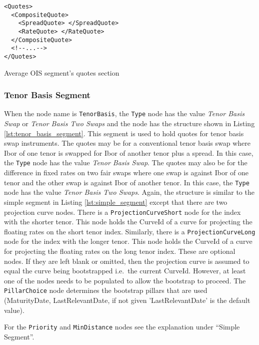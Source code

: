 \begin{listing}[H]
\begin{verbatim}
<Quotes>
  <CompositeQuote>
    <SpreadQuote> </SpreadQuote>
    <RateQuote> </RateQuote>
  </CompositeQuote>
  <!--...-->
</Quotes>
\end{verbatim}
\caption{Average OIS segment's quotes section}
\label{lst:average_ois_quotes}
\end{listing}

\subsubsection*{Tenor Basis Segment}
When the node name is \lstinline!TenorBasis!, the \lstinline!Type! node has the value \emph{Tenor Basis Swap} or
\emph{Tenor Basis Two Swaps} and the node has the structure shown in Listing \ref{lst:tenor_basis_segment}. This segment
is used to hold quotes for tenor basis swap instruments. The quotes may be for a conventional tenor basis swap where
Ibor of one tenor is swapped for Ibor of another tenor plus a spread. In this case, the \lstinline!Type! node has the
value \emph{Tenor Basis Swap}. The quotes may also be for the difference in fixed rates on two fair swaps where one swap
is against Ibor of one tenor and the other swap is against Ibor of another tenor. In this case, the \lstinline!Type!
node has the value \emph{Tenor Basis Two Swaps}. Again, the structure is similar to the simple segment in Listing
\ref{lst:simple_segment} except that there are two projection curve nodes. There is a \lstinline!ProjectionCurveShort!
node for the index with the shorter tenor. This node holds the CurveId of a curve for projecting the floating rates on
the short tenor index. Similarly, there is a \lstinline!ProjectionCurveLong! node for the index with the longer
tenor. This node holds the CurveId of a curve for projecting the floating rates on the long tenor index. These are
optional nodes. If they are left blank or omitted, then the projection curve is assumed to equal the curve being
bootstrapped i.e.\ the current CurveId. However, at least one of the nodes needs to be populated to allow the bootstrap
to proceed. The \lstinline!PillarChoice! node determines the bootstrap pillars that are used (MaturityDate,
LastRelevantDate, if not given 'LastRelevantDate' is the default value).

For the \lstinline!Priority! and \lstinline!MinDistance! nodes see the explanation under ``Simple Segment''.

